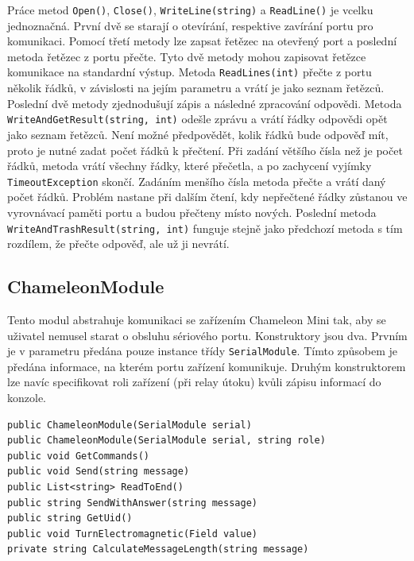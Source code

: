 Práce metod \verb|Open()|, \verb|Close()|, \verb|WriteLine(string)| a \verb|ReadLine()| je vcelku jednoznačná. První dvě se starají o otevírání, respektive zavírání portu pro komunikaci. Pomocí třetí metody lze zapsat řetězec na otevřený port a poslední metoda řetězec z portu přečte. Tyto dvě metody mohou zapisovat řetězce komunikace na standardní výstup. Metoda \verb|ReadLines(int)| přečte z portu několik řádků, v závislosti na jejím parametru a vrátí je jako seznam řetězců. Poslední dvě metody zjednodušují zápis a následné zpracování odpovědi. Metoda \verb|WriteAndGetResult(string, int)| odešle zprávu a vrátí řádky odpovědi opět jako seznam řetězců. Není možné předpovědět, kolik řádků bude odpověď mít, proto je nutné zadat počet řádků k přečtení. Při zadání většího čísla než je počet řádků, metoda vrátí všechny řádky, které přečetla, a po zachycení vyjímky \verb|TimeoutException| skončí. Zadáním menšího čísla metoda přečte a vrátí daný počet řádků. Problém nastane při dalším čtení, kdy nepřečtené řádky zůstanou ve vyrovnávací paměti portu a budou přečteny místo nových. Poslední metoda \verb|WriteAndTrashResult(string, int)| funguje stejně jako předchozí metoda s tím rozdílem, že přečte odpověď, ale už ji nevrátí.

\subsection*{ChameleonModule}
Tento modul abstrahuje komunikaci se zařízením Chameleon Mini tak, aby se uživatel nemusel starat o obsluhu sériového portu. Konstruktory jsou dva. Prvním je v parametru předána pouze instance třídy \verb|SerialModule|. Tímto způsobem je předána informace, na kterém portu zařízení komunikuje. Druhým konstruktorem lze navíc specifikovat roli zařízení (při relay útoku) kvůli zápisu informací do konzole.

\begin{lstlisting}[caption=Metody třídy \emph{ChameleonModule}, label={chameleonModuleMethods}]
public ChameleonModule(SerialModule serial)
public ChameleonModule(SerialModule serial, string role)
public void GetCommands()
public void Send(string message)
public List<string> ReadToEnd()
public string SendWithAnswer(string message)
public string GetUid()
public void TurnElectromagnetic(Field value)
private string CalculateMessageLength(string message)
\end{lstlisting}

